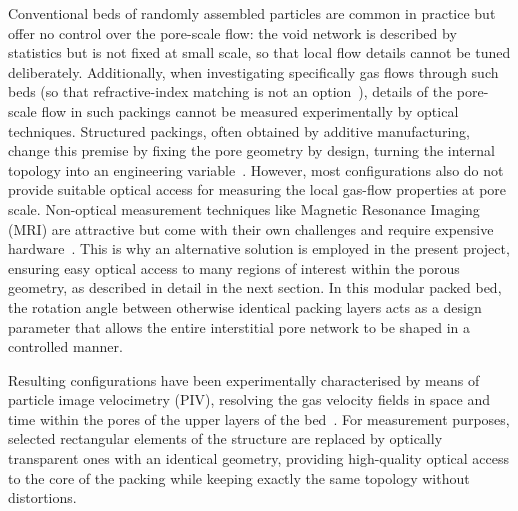 Conventional beds of randomly assembled particles are common in practice but offer no control over the pore-scale flow: the void network is described by statistics but is not fixed at small scale, so that local flow details cannot be tuned deliberately. Additionally, when investigating specifically gas flows through such beds (so that refractive-index matching is not an option~\cite{neeraj2023}), details of the pore-scale flow in such packings cannot be measured experimentally by optical techniques.
Structured packings, often obtained by additive manufacturing, change this premise by fixing the pore geometry by design, turning the internal topology into an engineering variable~\cite{Larsson.2018,li2022visualization}. However, most configurations also do not provide suitable optical access for measuring the local gas-flow properties at pore scale. Non-optical measurement techniques like Magnetic Resonance Imaging (MRI) are attractive but come with their own challenges and require expensive hardware~\cite{Sederman1997,Gladden2017}. This is why an alternative solution is employed in the present project, ensuring easy optical access to many regions of interest within the porous geometry, as described in detail in the next section. In this modular packed bed, the rotation angle between otherwise identical packing layers acts as a design parameter that allows the entire interstitial pore network to be shaped in a controlled manner.

Resulting configurations have been experimentally characterised by means of particle image velocimetry (PIV), resolving the gas velocity fields in space and time within the pores of the upper layers of the bed~\cite{velten2026,velten2026b}. For measurement purposes, selected rectangular elements of the structure are replaced by optically transparent ones with an identical geometry, providing high-quality optical access to the core of the packing while keeping exactly the same topology without distortions.


